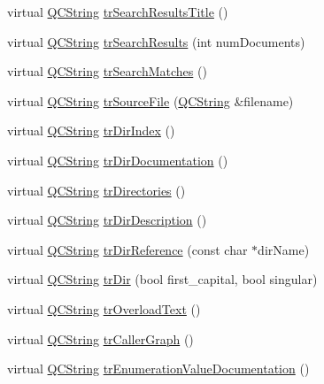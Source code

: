 \begin{DoxyCompactItemize}
\item 
virtual \hyperlink{class_q_c_string}{Q\-C\-String} \hyperlink{class_translator_croatian_a711c6a2b5461f1f055d00611ea3a0533}{tr\-Search\-Results\-Title} ()
\item 
virtual \hyperlink{class_q_c_string}{Q\-C\-String} \hyperlink{class_translator_croatian_ae43fbd8a6b08b331a6586422bd8c465e}{tr\-Search\-Results} (int num\-Documents)
\item 
virtual \hyperlink{class_q_c_string}{Q\-C\-String} \hyperlink{class_translator_croatian_a0677855fd52afcda6d47b2cc51e7de31}{tr\-Search\-Matches} ()
\item 
virtual \hyperlink{class_q_c_string}{Q\-C\-String} \hyperlink{class_translator_croatian_a1b3571c6c75d16ebe3763f510bd95b68}{tr\-Source\-File} (\hyperlink{class_q_c_string}{Q\-C\-String} \&filename)
\item 
virtual \hyperlink{class_q_c_string}{Q\-C\-String} \hyperlink{class_translator_croatian_ae9895001e5d8629fd068895b2ffa653f}{tr\-Dir\-Index} ()
\item 
virtual \hyperlink{class_q_c_string}{Q\-C\-String} \hyperlink{class_translator_croatian_a89a223d69d1255271719c256b2fd451b}{tr\-Dir\-Documentation} ()
\item 
virtual \hyperlink{class_q_c_string}{Q\-C\-String} \hyperlink{class_translator_croatian_ab7610b46aedb923a1524272dfbaeab38}{tr\-Directories} ()
\item 
virtual \hyperlink{class_q_c_string}{Q\-C\-String} \hyperlink{class_translator_croatian_abf769d2a217fcf6b9d3b9170fbbae7c8}{tr\-Dir\-Description} ()
\item 
virtual \hyperlink{class_q_c_string}{Q\-C\-String} \hyperlink{class_translator_croatian_ae680136bec0ce1d29a1e4e00d871797f}{tr\-Dir\-Reference} (const char $\ast$dir\-Name)
\item 
virtual \hyperlink{class_q_c_string}{Q\-C\-String} \hyperlink{class_translator_croatian_abb2b35bd374b96530198bf061054c951}{tr\-Dir} (bool first\-\_\-capital, bool singular)
\item 
virtual \hyperlink{class_q_c_string}{Q\-C\-String} \hyperlink{class_translator_croatian_ac5436cb286c48cd540d0cdce200a82b9}{tr\-Overload\-Text} ()
\item 
virtual \hyperlink{class_q_c_string}{Q\-C\-String} \hyperlink{class_translator_croatian_ae1d7d38cc426cd25124b1658b1125841}{tr\-Caller\-Graph} ()
\item 
virtual \hyperlink{class_q_c_string}{Q\-C\-String} \hyperlink{class_translator_croatian_a4039294191fddf0e9530b920719998fd}{tr\-Enumeration\-Value\-Documentation} ()

\end{DoxyCompactItemize}
